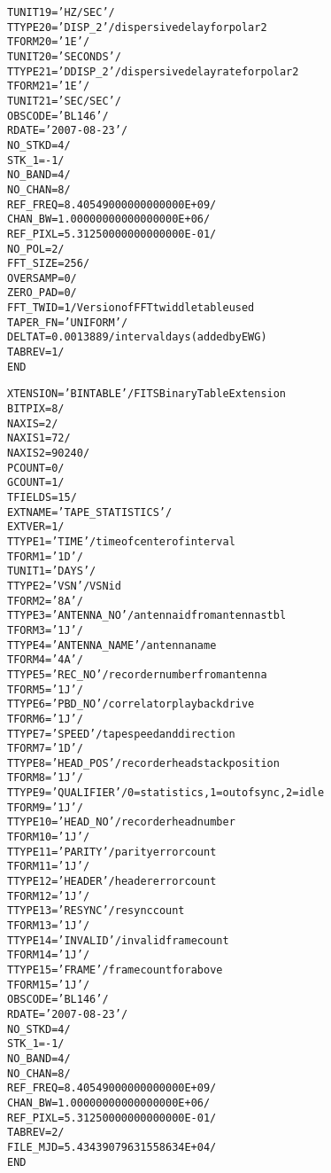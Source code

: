 \documentclass[twoside]{article}
\newcommand{\Ex}[1]{\textcolor{excol}{#1}}
\begin{document}
\begin{alltt}
TUNIT19 = 'HZ/SEC  '           /
TTYPE20 = 'DISP_2  '           / dispersive delay for polar 2
TFORM20 = '1E      '           /
TUNIT20 = 'SECONDS '           /
TTYPE21 = 'DDISP_2 '           / dispersive delay rate for polar 2
TFORM21 = '1E      '           /
TUNIT21 = 'SEC/SEC '           /
OBSCODE = 'BL146   '           /
RDATE   = '2007-08-23'         /
NO_STKD =                    4 /
STK_1   =                   -1 /
NO_BAND =                    4 /
NO_CHAN =                    8 /
REF_FREQ=   8.40549000000000000E+09 /
CHAN_BW =   1.00000000000000000E+06 /
REF_PIXL=   5.31250000000000000E-01 /
NO_POL  =                    2 /
FFT_SIZE=                  256 /
OVERSAMP=                    0 /
ZERO_PAD=                    0 /
FFT_TWID=                    1 / Version of FFT twiddle table used
TAPER_FN= 'UNIFORM '           /
\Ex{DELTAT=              0.0013889 / interval days (added by EWG)}
TABREV  =                    1 /
END
\end{alltt}

\begin{alltt}
XTENSION= 'BINTABLE'           / FITS Binary Table Extension
BITPIX  =                    8 /
NAXIS   =                    2 /
NAXIS1  =                   72 /
NAXIS2  =                90240 /
PCOUNT  =                    0 /
GCOUNT  =                    1 /
TFIELDS =                   15 /
EXTNAME = 'TAPE_STATISTICS'    /
EXTVER  =                    1 /
TTYPE1  = 'TIME    '           / time of center of interval
TFORM1  = '1D      '           /
TUNIT1  = 'DAYS    '           /
TTYPE2  = 'VSN     '           / VSN id
TFORM2  = '8A      '           /
TTYPE3  = 'ANTENNA_NO'         / antenna id from antennas tbl
TFORM3  = '1J      '           /
TTYPE4  = 'ANTENNA_NAME'       / antenna name
TFORM4  = '4A      '           /
TTYPE5  = 'REC_NO  '           / recorder number from antenna
TFORM5  = '1J      '           /
TTYPE6  = 'PBD_NO  '           / correlator playback drive
TFORM6  = '1J      '           /
TTYPE7  = 'SPEED   '           / tape speed and direction
TFORM7  = '1D      '           /
TTYPE8  = 'HEAD_POS'           / recorder headstack position
TFORM8  = '1J      '           /
TTYPE9  = 'QUALIFIER'          / 0 = statistics, 1 = out of sync, 2 = idle
TFORM9  = '1J      '           /
TTYPE10 = 'HEAD_NO '           / recorder head number
TFORM10 = '1J      '           /
TTYPE11 = 'PARITY  '           / parity error count
TFORM11 = '1J      '           /
TTYPE12 = 'HEADER  '           / header error count
TFORM12 = '1J      '           /
TTYPE13 = 'RESYNC  '           / resync count
TFORM13 = '1J      '           /
TTYPE14 = 'INVALID '           / invalid frame count
TFORM14 = '1J      '           /
TTYPE15 = 'FRAME   '           / frame count for above
TFORM15 = '1J      '           /
OBSCODE = 'BL146   '           /
RDATE   = '2007-08-23'         /
NO_STKD =                    4 /
STK_1   =                   -1 /
NO_BAND =                    4 /
NO_CHAN =                    8 /
REF_FREQ=   8.40549000000000000E+09 /
CHAN_BW =   1.00000000000000000E+06 /
REF_PIXL=   5.31250000000000000E-01 /
TABREV  =                    2 /
FILE_MJD=   5.43439079631558634E+04 /
END
\end{alltt}
\end{document}
